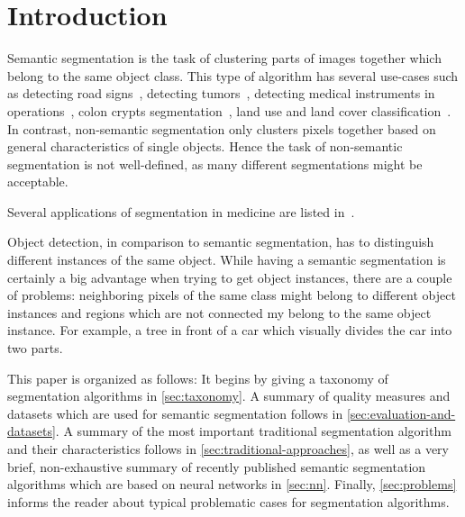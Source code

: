 
\section{Introduction}\label{sec:introduction}
Semantic segmentation is the task of clustering parts of images together which
belong to the same object class. This type of algorithm has several use-cases
such as detecting road signs~\cite{4220659}, detecting
tumors~\cite{moon2002automatic}, detecting medical instruments in
operations~\cite{wei1997automatic}, colon crypts
segmentation~\cite{cohen2015memory}, land use and land cover
classification~\cite{huang2002assessment}. In contrast, non-semantic
segmentation only clusters pixels together based on general characteristics of
single objects. Hence the task of non-semantic segmentation is not
well-defined, as many different segmentations might be acceptable.

Several applications of segmentation in medicine are listed
in~\cite{annurev.bioeng.2.1.315}.

Object detection, in comparison to semantic segmentation, has to distinguish
different instances of the same object. While having a semantic segmentation is
certainly a big advantage when trying to get object instances, there are a
couple of problems: neighboring pixels of the same class might belong to
different object instances and regions which are not connected my belong to the
same object instance. For example, a tree in front of a car which visually
divides the car into two parts.

This paper is organized as follows: It begins by giving a taxonomy of
segmentation algorithms in \cref{sec:taxonomy}. A summary of quality measures
and datasets which are used for semantic segmentation follows in
\cref{sec:evaluation-and-datasets}. A summary of the most important traditional
segmentation algorithm and their characteristics follows in
\cref{sec:traditional-approaches}, as well as a very brief, non-exhaustive
summary of recently published semantic segmentation algorithms which are based
on neural networks in \cref{sec:nn}. Finally, \cref{sec:problems} informs the
reader about typical problematic cases for segmentation algorithms.

